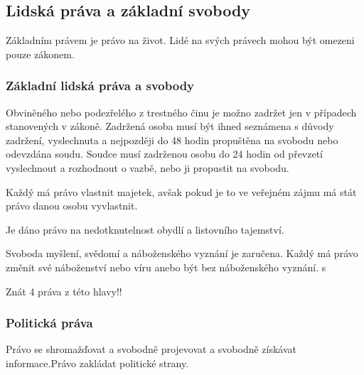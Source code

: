 \documentclass[10pt,a4paper,
twoside,%
]{report}
\begin{document}
 \subsection{Lidská práva a základní svobody}
Základním právem je právo na život. Lidé na svých právech mohou být omezeni pouze zákonem.  

\subsubsection{Základní lidská práva a svobody}

Obviněného nebo podezřelého z trestného činu je možno zadržet jen v případech stanovených v zákoně. Zadržená osoba musí být ihned seznámena s důvody zadržení, vyslechnuta a nejpozději do 48 hodin propuštěna na svobodu nebo odevzdána soudu. Soudce musí zadrženou osobu do 24 hodin od převzetí vyslechnout a rozhodnout o vazbě, nebo ji propustit na svobodu.

Každý má právo vlastnit majetek, avšak pokud je to ve veřejném zájmu má stát právo danou osobu vyvlastnit. 

Je dáno právo na nedotknutelnost obydlí a listovního tajemství.

 Svoboda myšlení, svědomí a náboženského vyznání je zaručena. Každý má právo změnit své náboženství nebo víru anebo být bez náboženského vyznání.
 s
\begin{center}
\textsf{Znát 4 práva z této hlavy!!}
\end{center}
\subsubsection{Politická práva}

Právo se shromažďovat a svobodně projevovat a svobodně získávat informace.Právo zakládat politické strany.
\end{document}
